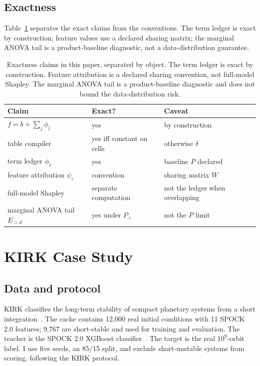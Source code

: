 \documentclass[twoside,11pt]{article}
\begin{document}
\subsection{Exactness}

Table~\ref{tab:exactness} separates the exact claims from the conventions. The
term ledger is exact by construction; feature values use a declared sharing
matrix; the marginal ANOVA tail is a product-baseline diagnostic, not a
data-distribution guarantee.

\begin{table}[t]
\centering
\normalsize
\setlength{\tabcolsep}{4pt}
\begin{tabular}{@{}lll@{}}
\toprule
Claim & Exact? & Caveat \\
\midrule
$f=b+\sum_j\phi_j$ & yes & by construction \\
table compiler & yes iff constant on cells & otherwise $\delta$ \\
term ledger $\phi_j$ & yes & baseline $P$ declared \\
feature attribution $\psi_i$ & convention & sharing matrix $W$ \\
full-model Shapley & separate computation & not the ledger when overlapping \\
marginal ANOVA tail $E_{>d}$ & yes under $P_\perp$ & not the $P$ limit \\
\bottomrule
\end{tabular}
\caption{Exactness claims in this paper, separated by object. The term ledger is
exact by construction. Feature attribution is a declared sharing convention, not
full-model Shapley. The marginal ANOVA tail is a product-baseline diagnostic and
does not bound the data-distribution risk.}
\label{tab:exactness}
\end{table}

\section{KIRK Case Study}

\subsection{Data and protocol}

KIRK classifies the long-term stability of compact planetary systems from a
short integration~\citep{tamayo2020spock,thadhani2025spock,hussain2020shadows,rein2017rebound}.
The cache contains 12,000 real initial conditions with 11 SPOCK 2.0 features;
9,767 are short-stable and used for training and evaluation. The teacher is the
SPOCK 2.0 XGBoost classifier~\citep{thadhani2025spock}. The target is the real
$10^9$-orbit label. I use five seeds, an 85/15 split, and exclude short-unstable
systems from scoring, following the KIRK protocol.
\end{document}
